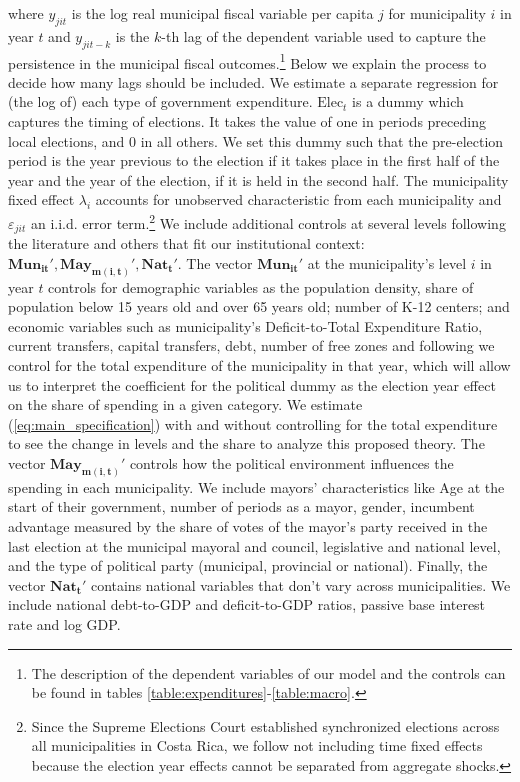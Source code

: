 where $y_{jit}$ is the log real municipal fiscal variable per capita $j$ for municipality $i$ in year $t$ and $y_{jit-k}$ is the $k$-th lag of the dependent variable used to capture the persistence in the municipal fiscal outcomes.\footnote{The description of the dependent variables of our model and the controls can be found in tables \ref{table:expenditures}-\ref{table:macro}. } Below we explain the process to decide how many lags should be included. We estimate a separate regression for (the log of) each type of government expenditure. $\text{Elec}_t$ is a dummy which captures the timing of elections. It takes the value of one in periods preceding local elections, and 0 in all others. We set this dummy such that the pre-election period is the year previous to the election if it takes place in the first half of the year and the year of the election, if it is held in the second half. The municipality fixed effect $\lambda_i$ accounts for unobserved characteristic from each municipality and $\varepsilon_{jit}$ an i.i.d. error term.\footnote{Since the Supreme Elections Court established synchronized elections across all municipalities in Costa Rica, we follow \textcite{chortareas2016} not including time fixed effects because the election year effects cannot be separated from aggregate shocks. }  We include additional controls at several levels following the literature and others that fit our institutional context: $\mathbf{Mun_{it}'},\mathbf{May_{m(i,t)}'},\mathbf{Nat_{t}'}$. The vector $\mathbf{Mun_{it}'}$ at the municipality's level $i$ in year $t$ controls for demographic variables as the population density, share of population below 15 years old and over 65 years old; number of K-12 centers; and economic variables such as municipality's Deficit-to-Total Expenditure Ratio, current transfers, capital transfers, debt, number of free zones and following \textcite{drazen2010} we control for the total expenditure of the municipality in that year, which will allow us to interpret the coefficient for the political dummy as the election year effect on the share of spending in a given category. We estimate (\ref{eq:main_specification}) with and without controlling for the total expenditure to see the change in levels and the share to analyze this proposed theory. The vector $\mathbf{May_{m(i,t)}'}$ controls how the political environment influences the spending in each municipality. We include mayors' characteristics like Age at the start of their government, number of periods as a mayor, gender, incumbent advantage measured by the share of votes of the mayor's party received in the last election at the municipal mayoral and council, legislative and national level, and the type of political party (municipal, provincial or national). Finally, the vector $\mathbf{Nat_{t}'}$ contains national variables that don't vary across municipalities. We include national debt-to-GDP and deficit-to-GDP ratios, passive base interest rate and log GDP. 

